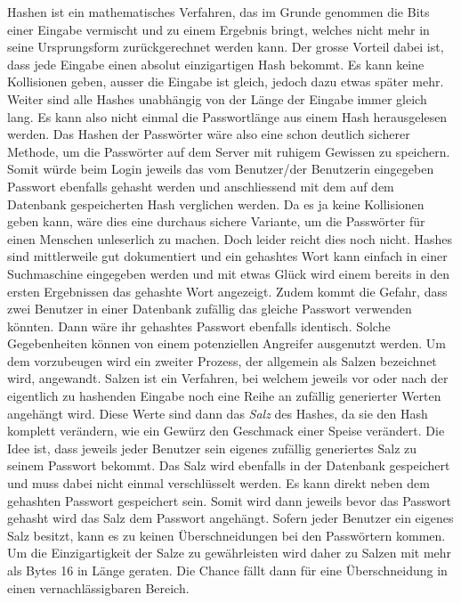 \documentclass[a4paper,11pt]{report}
\begin{document}
		Hashen ist ein mathematisches Verfahren, das im Grunde genommen die Bits einer Eingabe vermischt und zu einem Ergebnis bringt, welches nicht mehr in seine Ursprungsform zurückgerechnet werden kann. Der grosse Vorteil dabei ist, dass jede Eingabe einen absolut einzigartigen Hash bekommt. Es kann keine Kollisionen geben, ausser die Eingabe ist gleich, jedoch dazu etwas später mehr. Weiter sind alle Hashes unabhängig von der Länge der Eingabe immer gleich lang. Es kann also nicht einmal die Passwortlänge aus einem Hash herausgelesen werden. Das Hashen der Passwörter wäre also eine schon deutlich sicherer Methode, um die Passwörter auf dem Server mit ruhigem Gewissen zu speichern. Somit würde beim Login jeweils das vom Benutzer/der Benutzerin eingegeben Passwort ebenfalls gehasht werden und anschliessend mit dem auf dem Datenbank gespeicherten Hash verglichen werden. Da es ja keine Kollisionen geben kann, wäre dies eine durchaus sichere Variante, um die Passwörter für einen Menschen unleserlich zu machen. Doch leider reicht dies noch nicht. Hashes sind mittlerweile gut dokumentiert und ein gehashtes Wort kann einfach in einer Suchmaschine eingegeben werden und mit etwas Glück wird einem bereits in den ersten Ergebnissen das gehashte Wort angezeigt. Zudem kommt die Gefahr, dass zwei Benutzer in einer Datenbank zufällig das gleiche Passwort verwenden könnten. Dann wäre ihr gehashtes Passwort ebenfalls identisch. Solche Gegebenheiten können von einem potenziellen Angreifer ausgenutzt werden. Um dem vorzubeugen wird ein zweiter Prozess, der allgemein als Salzen bezeichnet wird, angewandt. Salzen ist ein Verfahren, bei welchem jeweils vor oder nach der eigentlich zu hashenden Eingabe noch eine Reihe an zufällig generierter Werten angehängt wird. Diese Werte sind dann das \emph{Salz} des Hashes, da sie den Hash komplett verändern, wie ein Gewürz den Geschmack einer Speise verändert. Die Idee ist, dass jeweils jeder Benutzer sein eigenes zufällig generiertes Salz zu seinem Passwort bekommt. Das Salz wird ebenfalls in der Datenbank gespeichert und muss dabei nicht einmal verschlüsselt werden. Es kann direkt neben dem gehashten Passwort gespeichert sein. Somit wird dann jeweils bevor das Passwort gehasht wird das Salz dem Passwort angehängt. Sofern jeder Benutzer ein eigenes Salz besitzt, kann es zu keinen Überschneidungen bei den Passwörtern kommen. Um die Einzigartigkeit der Salze zu gewährleisten wird daher zu Salzen mit mehr als Bytes 16 in Länge geraten. Die Chance fällt dann für eine Überschneidung in einen vernachlässigbaren Bereich. 
		
\end{document}

